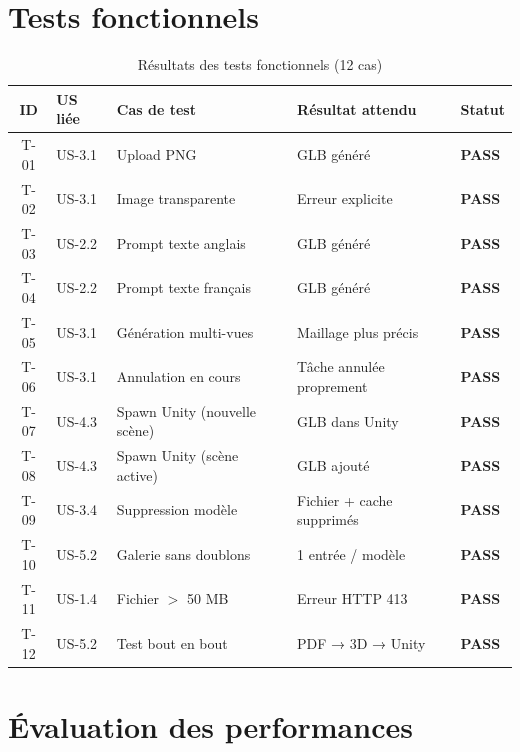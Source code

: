 \documentclass[12pt,a4paper,oneside]{report}
\begin{document}
\section{Tests fonctionnels}

\begin{table}[H]
\centering
\caption{Résultats des tests fonctionnels (12 cas)}
\label{tab:tests}
\begin{tabularx}{\linewidth}{@{}cllXl@{}}
\toprule
\textbf{ID} & \textbf{US liée} & \textbf{Cas de test}
            & \textbf{Résultat attendu} & \textbf{Statut} \\\midrule
T-01 & US-3.1 & Upload PNG             & GLB généré & \textcolor{crispgreen}{\textbf{PASS}} \\
T-02 & US-3.1 & Image transparente     & Erreur explicite & \textcolor{crispgreen}{\textbf{PASS}} \\
T-03 & US-2.2 & Prompt texte anglais   & GLB généré & \textcolor{crispgreen}{\textbf{PASS}} \\
T-04 & US-2.2 & Prompt texte français  & GLB généré & \textcolor{crispgreen}{\textbf{PASS}} \\
T-05 & US-3.1 & Génération multi-vues  & Maillage plus précis & \textcolor{crispgreen}{\textbf{PASS}} \\
T-06 & US-3.1 & Annulation en cours    & Tâche annulée proprement & \textcolor{crispgreen}{\textbf{PASS}} \\
T-07 & US-4.3 & Spawn Unity (nouvelle scène) & GLB dans Unity & \textcolor{crispgreen}{\textbf{PASS}} \\
T-08 & US-4.3 & Spawn Unity (scène active)   & GLB ajouté  & \textcolor{crispgreen}{\textbf{PASS}} \\
T-09 & US-3.4 & Suppression modèle     & Fichier + cache supprimés & \textcolor{crispgreen}{\textbf{PASS}} \\
T-10 & US-5.2 & Galerie sans doublons  & 1 entrée / modèle & \textcolor{crispgreen}{\textbf{PASS}} \\
T-11 & US-1.4 & Fichier $>$ 50 MB      & Erreur HTTP 413 & \textcolor{crispgreen}{\textbf{PASS}} \\
T-12 & US-5.2 & Test bout en bout      & PDF → 3D → Unity & \textcolor{crispgreen}{\textbf{PASS}} \\
\bottomrule
\end{tabularx}
\end{table}

\section{Évaluation des performances}
\end{document}
